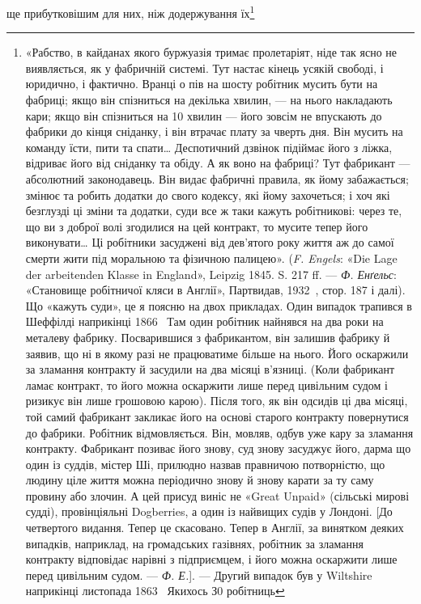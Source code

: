 ще прибутковішим для них, ніж додержування їх\footnote{
«Рабство, в кайданах якого буржуазія тримає пролетаріят, ніде
так ясно не виявляється, як у фабричній системі. Тут настає кінець
усякій свободі, і юридично, і фактично. Вранці о пів на шосту робітник
мусить бути на фабриці; якщо він спізниться на декілька хвилин, — на
нього накладають кари; якщо він спізниться на 10 хвилин — його зовсім
не впускають до фабрики до кінця сніданку, і він втрачає плату за
чверть дня. Він мусить на команду їсти, пити та спати\dots{} Деспотичний
дзвінок підіймає його з ліжка, відриває його від сніданку та обіду. А як
воно на фабриці? Тут фабрикант — абсолютний законодавець. Він видає
фабричні правила, як йому забажається; змінює та робить додатки
до свого кодексу, які йому захочеться; і хоч які безглузді ці зміни та
додатки, суди все ж таки кажуть робітникові: через те, що ви з доброї
волі згодилися на цей контракт, то мусите тепер його виконувати\dots{} Ці
робітники засуджені від дев’ятого року життя аж до самої смерти жити
під моральною та фізичною палицею». (\emph{F. Engels}: «Die Lage der
arbeitenden Klasse in England», Leipzig 1845. S. 217 ff. — \emph{Ф. Енґельс}:
«Становище робітничої кляси в Англії», Партвидав, 1932~, стор. 187 і
далі). Що «кажуть суди», це я поясню на двох прикладах. Один випадок
трапився в Шеффілді наприкінці 1866~ Там один робітник найнявся
на два роки на металеву фабрику. Посварившися з фабрикантом,
він залишив фабрику й заявив, що ні в якому разі не працюватиме
більше на нього. Його оскаржили за зламання контракту й засудили
на два місяці в’язниці. (Коли фабрикант ламає контракт, то його можна
оскаржити лише перед цивільним судом і ризикує він лише грошовою
карою). Після того, як він одсидів ці два місяці, той самий фабрикант
закликає його на основі старого контракту повернутися до фабрики.
Робітник відмовляється. Він, мовляв, одбув уже кару за зламання контракту.
Фабрикант позиває його знову, суд знову засуджує його, дарма
що один із суддів, містер Ші, прилюдно назвав правничою потворністю,
що людину ціле життя можна періодично знову й знову карати за ту саму
провину або злочин. А цей присуд виніс не «Great Unpaid» (сільські
мирові судді), провінціяльні Dogberries, а один із найвищих судів у
Лондоні. [До четвертого видання. Тепер це скасовано. Тепер в Англії,
за винятком деяких випадків, наприклад, на громадських газівнях, робітник
за зламання контракту відповідає нарівні з підприємцем, і його
можна оскаржити лише перед цивільним судом. — \emph{Ф. Е.}]. — Другий
випадок був у Wiltshire наприкінці листопада 1863~ Якихось З0 робітниць
}
